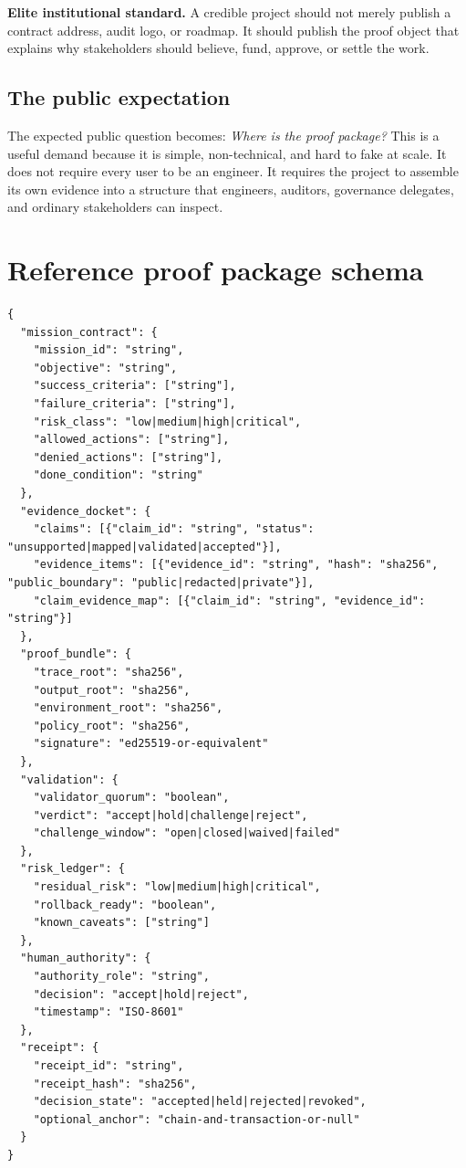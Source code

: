 \begin{mandatebox}
\textbf{Elite institutional standard.} A credible project should not merely publish a contract address, audit logo, or roadmap. It should publish the proof object that explains why stakeholders should believe, fund, approve, or settle the work.
\end{mandatebox}

\subsection{The public expectation}

The expected public question becomes: \emph{Where is the proof package?} This is a useful demand because it is simple, non-technical, and hard to fake at scale. It does not require every user to be an engineer. It requires the project to assemble its own evidence into a structure that engineers, auditors, governance delegates, and ordinary stakeholders can inspect.

\section{Reference proof package schema}

\begin{lstlisting}[caption={Minimal public-safe proof package schema.}]
{
  "mission_contract": {
    "mission_id": "string",
    "objective": "string",
    "success_criteria": ["string"],
    "failure_criteria": ["string"],
    "risk_class": "low|medium|high|critical",
    "allowed_actions": ["string"],
    "denied_actions": ["string"],
    "done_condition": "string"
  },
  "evidence_docket": {
    "claims": [{"claim_id": "string", "status": "unsupported|mapped|validated|accepted"}],
    "evidence_items": [{"evidence_id": "string", "hash": "sha256", "public_boundary": "public|redacted|private"}],
    "claim_evidence_map": [{"claim_id": "string", "evidence_id": "string"}]
  },
  "proof_bundle": {
    "trace_root": "sha256",
    "output_root": "sha256",
    "environment_root": "sha256",
    "policy_root": "sha256",
    "signature": "ed25519-or-equivalent"
  },
  "validation": {
    "validator_quorum": "boolean",
    "verdict": "accept|hold|challenge|reject",
    "challenge_window": "open|closed|waived|failed"
  },
  "risk_ledger": {
    "residual_risk": "low|medium|high|critical",
    "rollback_ready": "boolean",
    "known_caveats": ["string"]
  },
  "human_authority": {
    "authority_role": "string",
    "decision": "accept|hold|reject",
    "timestamp": "ISO-8601"
  },
  "receipt": {
    "receipt_id": "string",
    "receipt_hash": "sha256",
    "decision_state": "accepted|held|rejected|revoked",
    "optional_anchor": "chain-and-transaction-or-null"
  }
}
\end{lstlisting}

